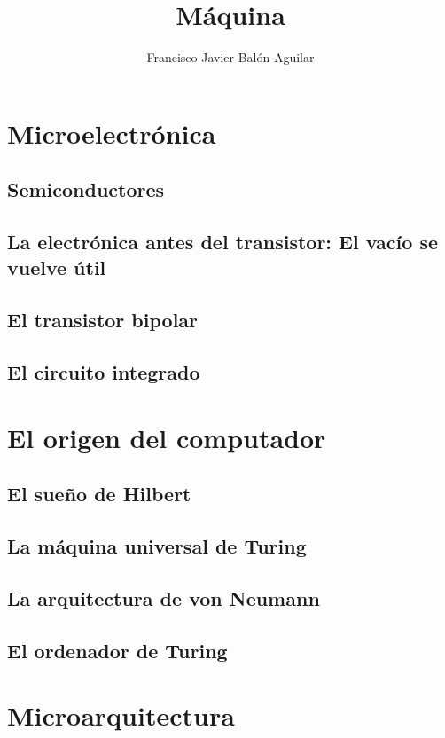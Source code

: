 \documentclass[a4paper, 11pt, titlepage]{book}
\title{Máquina}
\author{Francisco Javier Balón Aguilar}
\begin{document}
\maketitle
\renewcommand{\contentsname}{Índice}
\tableofcontents
\newpage

\chapter{Microelectrónica}

    \section{Semiconductores}

    \section{La electrónica antes del transistor: El vacío se vuelve útil}

    \section{El transistor bipolar}

    \section{El circuito integrado}

\chapter{El origen del computador}

    \section{El sueño de Hilbert}

    \section{La máquina universal de Turing}

    \section{La arquitectura de von Neumann}

    \section{El ordenador de Turing}

\chapter{Microarquitectura}
\end{document}
